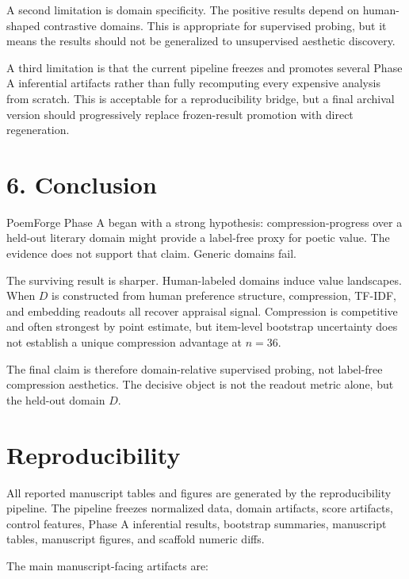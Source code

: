 \documentclass[11pt]{article}
\begin{document}
A second limitation is domain specificity. The positive results depend on human-shaped contrastive domains. This is appropriate for supervised probing, but it means the results should not be generalized to unsupervised aesthetic discovery.

A third limitation is that the current pipeline freezes and promotes several Phase A inferential artifacts rather than fully recomputing every expensive analysis from scratch. This is acceptable for a reproducibility bridge, but a final archival version should progressively replace frozen-result promotion with direct regeneration.

\section{6. Conclusion}

PoemForge Phase A began with a strong hypothesis: compression-progress over a held-out literary domain might provide a label-free proxy for poetic value. The evidence does not support that claim. Generic domains fail.

The surviving result is sharper. Human-labeled domains induce value landscapes. When \(D\) is constructed from human preference structure, compression, TF-IDF, and embedding readouts all recover appraisal signal. Compression is competitive and often strongest by point estimate, but item-level bootstrap uncertainty does not establish a unique compression advantage at \(n=36\).

The final claim is therefore domain-relative supervised probing, not label-free compression aesthetics. The decisive object is not the readout metric alone, but the held-out domain \(D\).

\section{Reproducibility}

All reported manuscript tables and figures are generated by the reproducibility pipeline. The pipeline freezes normalized data, domain artifacts, score artifacts, control features, Phase A inferential results, bootstrap summaries, manuscript tables, manuscript figures, and scaffold numeric diffs.

The main manuscript-facing artifacts are:
\end{document}
